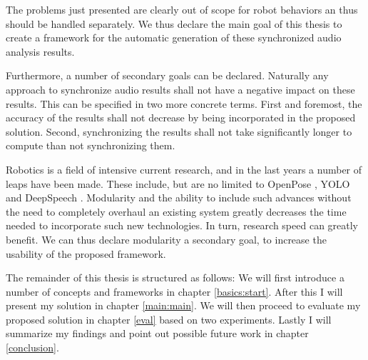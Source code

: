 The problems just presented are clearly out of scope for robot behaviors an thus should be handled separately.
We thus declare the main goal of this thesis to create a framework for the automatic generation of these synchronized audio analysis results.

Furthermore, a number of secondary goals can be declared.
Naturally any approach to synchronize audio results shall not have a negative impact on these results.
This can be specified in two more concrete terms.
First and foremost, the accuracy of the results shall not decrease by being incorporated in the proposed solution.
Second, synchronizing the results shall not take significantly longer to compute than not synchronizing them.


Robotics is a field of intensive current research, and in the last years a number of leaps have been made.
These include, but are no limited to OpenPose \cite{cao2018openpose}, YOLO \cite{yolov3} and DeepSpeech \cite{deepspeech}.
Modularity and the ability to include such advances without the need to completely overhaul an existing system greatly decreases the time needed to incorporate such new technologies.
In turn, research speed can greatly benefit.
We can thus declare modularity a secondary goal, to increase the usability of the proposed framework.


The remainder of this thesis is structured as follows:
We will first introduce a number of concepts and frameworks in chapter \ref{basics:start}.
After this I will present my solution in chapter \ref{main:main}.
We will then proceed to evaluate my proposed solution in chapter \ref{eval} based on two experiments.
Lastly I will summarize my findings and point out possible future work in chapter \ref{conclusion}.
